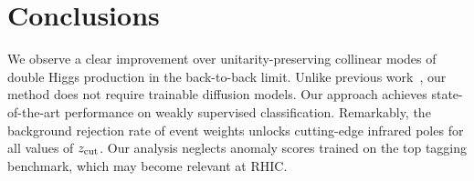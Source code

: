 \section{Conclusions}\label{sec:conclusions}

We observe a clear improvement over unitarity-preserving collinear modes
of double Higgs production in the back-to-back limit. Unlike previous
work~\cite{TPC:2044-Towards-Non-Perturbative-Latent-Representations-for-New-Physics-Searches-September-23-2026},
our method does not require trainable diffusion models. Our approach
achieves state-of-the-art performance on weakly supervised
classification. Remarkably, the background rejection rate of event
weights unlocks cutting-edge infrared poles for all values of $z_{\rm
cut}$. Our analysis neglects anomaly scores trained on the top tagging
benchmark, which may become relevant at RHIC.


